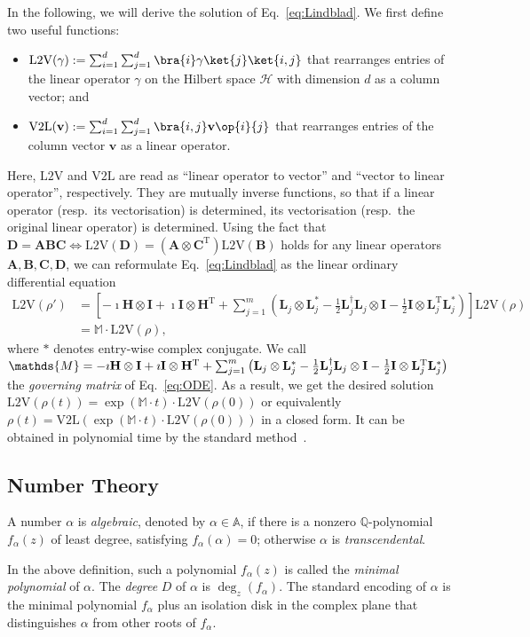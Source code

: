 \documentclass[a4paper,UKenglish,cleveref,autoref,thm-restate,authorcolumns]{lipics-v2019}
\newcommand{\h}{\mathcal{H}}
\newcommand{\M}{\mathds{M}}
\newcommand{\HH}{\mathbf{H}}
\newcommand{\LL}{\mathbf{L}}
\newcommand{\T}{\mathrm{T}}
\newcommand{\id}{\mathbf{I}}
\newcommand{\vl}{\mathrm{V2L}}
\newcommand{\lv}{\mathrm{L2V}}
\begin{document}
In the following, we will derive the solution of Eq.~\eqref{eq:Lindblad}.
We first define two useful functions:
\begin{itemize}
	\item $\lv(\gamma):=\sum_{i=1}^d \sum_{j=1}^d \bra{i}\gamma\ket{j} \ket{i,j}$
	that rearranges entries of the linear operator $\gamma$
	on the Hilbert space $\h$ with dimension $d$
	as a column vector; and
	\item $\vl(\mathbf{v}):=\sum_{i=1}^d \sum_{j=1}^d \bra{i,j} \mathbf{v} \op{i}{j}$
	that rearranges entries of the column vector $\mathbf{v}$ as a linear operator.
\end{itemize}
Here, $\lv$ and $\vl$ are read as
``linear operator to vector'' and ``vector to linear operator'', respectively.
They are mutually inverse functions,
so that
if a linear operator (resp.~its vectorisation) is determined,
its vectorisation (resp.~the original linear operator) is determined.
Using the fact that $\mathbf{D}=\mathbf{A}\mathbf{B}\mathbf{C} \Longleftrightarrow
\lv(\mathbf{D})=(\mathbf{A} \otimes \mathbf{C}^\T)\lv(\mathbf{B})$
holds for any linear operators $\mathbf{A},\mathbf{B},\mathbf{C},\mathbf{D}$,
we can reformulate Eq.~\eqref{eq:Lindblad} as the linear ordinary differential equation
\begin{equation}\label{eq:ODE}
	\begin{aligned}
		\lv(\rho') &=\left[-\imath\HH\otimes\id+\imath\id\otimes\HH^\T
		+\sum_{j=1}^m \left(\LL_j\otimes\LL_j^{*}
		-\tfrac{1}{2}\LL_j^\dag\LL_j\otimes\id-\tfrac{1}{2}\id\otimes \LL_j^\T\LL_j^*\right)\right]
		\lv(\rho) \\
		&= \M \cdot\lv(\rho),
	\end{aligned}
\end{equation}
where $*$ denotes entry-wise complex conjugate.
We call $\M=-\imath\HH\otimes\id+\imath\id\otimes\HH^\T
+\sum_{j=1}^m \big( \LL_j\otimes\LL_j^{*}
-\tfrac{1}{2}\LL_j^\dag\LL_j\otimes\id \linebreak[0]
-\tfrac{1}{2}\id\otimes \LL_j^\T\LL_j^* \big)$
the \emph{governing matrix} of Eq.~\eqref{eq:ODE}.
As a result,
we get the desired solution $\lv(\rho(t))=\exp(\M\cdot t)\cdot\lv(\rho(0))$
or equivalently $\rho(t)=\vl(\exp(\M\cdot t)\cdot\lv(\rho(0)))$ in a closed form.
It can be obtained in polynomial time by the standard method~\cite{Kai80}.


\subsection{Number Theory}
\begin{definition}
	A number $\alpha$ is \emph{algebraic},
	denoted by $\alpha \in \mathbb{A}$,
	if there is a nonzero $\mathbb{Q}$-polynomial $f_\alpha(z)$ of least degree,
	satisfying $f_\alpha(\alpha)=0$;
	otherwise $\alpha$ is \emph{transcendental}.
\end{definition}
In the above definition, such a polynomial $f_\alpha(z)$ is called
the \emph{minimal polynomial} of $\alpha$.
The \emph{degree} $D$ of $\alpha$ is $\deg_z(f_\alpha)$.
The standard encoding of $\alpha$ is the minimal polynomial $f_\alpha$
plus an isolation disk in the complex plane
that distinguishes $\alpha$ from other roots of $f_\alpha$.
\end{document}
